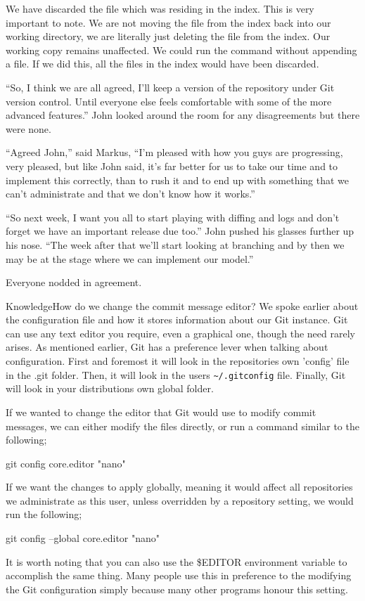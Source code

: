 We have discarded the file which was residing in the index.
This is very important to note.
We are not moving the file from the index back into our working directory, we are literally just deleting the file from the index.
Our working copy remains unaffected.
We could run the  command without appending a file.
If we did this, all the files in the index would have been discarded.

\begin{trenches}
``So, I think we are all agreed, I'll keep a version of the repository under Git version control.
Until everyone else feels comfortable with some of the more advanced features.'' John looked around the room for any disagreements but there were none.

``Agreed John,'' said Markus, ``I'm pleased with how you guys are progressing, very pleased, but like John said, it's far better for us to take our time and to implement this correctly, than to rush it and to end up with something that we can't administrate and that we don't know how it works.''

``So next week, I want you all to start playing with diffing and logs and don't forget we have an important release due too.'' John pushed his glasses further up his nose.
``The week after that we'll start looking at branching and by then we may be at the stage where we can implement our model.''

Everyone nodded in agreement.
\end{trenches}

\begin{callout}{Knowledge}{How do we change the commit message editor?}
We spoke earlier about the configuration file and how it stores information about our Git instance.
Git can use any text editor you require, even a graphical one, though the need rarely arises.
As mentioned earlier, Git has a preference lever when talking about configuration.
First and foremost it will look in the repositories own 'config' file in the .git folder.
Then, it will look in the users \texttt{\textasciitilde/.gitconfig} file.
Finally, Git will look in your distributions own global folder.

If we wanted to change the editor that Git would use to modify commit messages, we can either modify the files directly, or run a command similar to the following;

\begin{code}
git config core.editor "nano"
\end{code}

If we want the changes to apply globally, meaning it would affect all repositories we administrate as this user, unless overridden by a repository setting, we would run the following;

\begin{code}
git config --global core.editor "nano"
\end{code}

It is worth noting that you can also use the \$EDITOR environment variable to accomplish the same thing.
Many people use this in preference to the modifying the Git configuration simply because many other programs honour this setting.
\end{callout}


